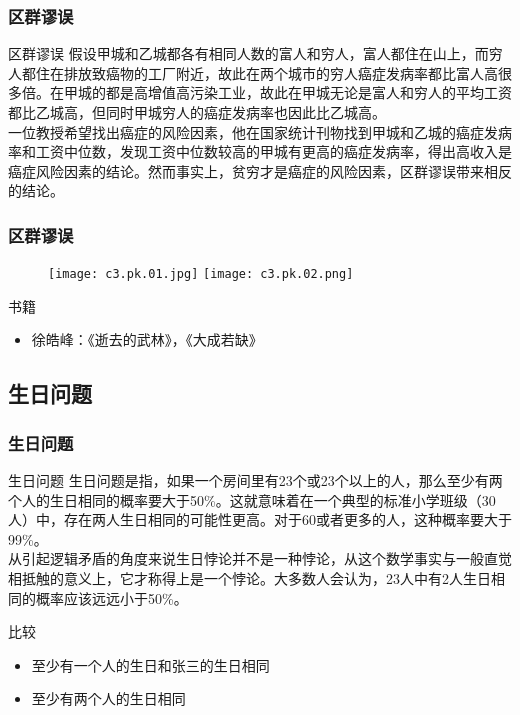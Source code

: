 \begin{frame}
  \frametitle{区群谬误}
  \begin{block}{区群谬误}
假设甲城和乙城都各有相同人数的富人和穷人，富人都住在山上，而穷人都住在排放致癌物的工厂附近，故此在两个城市的穷人癌症发病率都比富人高很多倍。在甲城的都是高增值高污染工业，故此在甲城无论是富人和穷人的平均工资都比乙城高，但同时甲城穷人的癌症发病率也因此比乙城高。\\
\vspace{1em}
一位教授希望找出癌症的风险因素，他在国家统计刊物找到甲城和乙城的癌症发病率和工资中位数，发现工资中位数较高的甲城有更高的癌症发病率，得出高收入是癌症风险因素的结论。然而事实上，贫穷才是癌症的风险因素，区群谬误带来相反的结论。
  \end{block}
\end{frame}

\begin{frame}
  \frametitle{区群谬误}
  \begin{figure}
    \centering
    \texttt{[image: c3.pk.01.jpg]}\quad
    \texttt{[image: c3.pk.02.png]}
  \end{figure}
  \begin{block}{书籍}
    \begin{itemize}
      \item 徐皓峰：《逝去的武林》，《大成若缺》
    \end{itemize}
  \end{block}
\end{frame}

\subsection{生日问题}
\begin{frame}
  \frametitle{生日问题}
  \begin{block}{生日问题}
生日问题是指，如果一个房间里有23个或23个以上的人，那么至少有两个人的生日相同的概率要大于50\%。这就意味着在一个典型的标准小学班级（30人）中，存在两人生日相同的可能性更高。对于60或者更多的人，这种概率要大于99\%。\\
\vspace{0.3em}
从引起逻辑矛盾的角度来说生日悖论并不是一种悖论，从这个数学事实与一般直觉相抵触的意义上，它才称得上是一个悖论。大多数人会认为，23人中有2人生日相同的概率应该远远小于50\%。
  \end{block}
  \pause
  \begin{block}{比较}
    \begin{itemize}
      \item 至少有一个人的生日和张三的生日相同
      \item 至少有两个人的生日相同
    \end{itemize}
  \end{block}
\end{frame}

